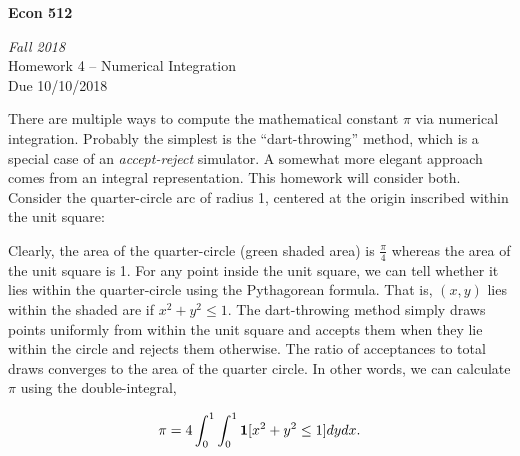 \documentclass{article}
\newcommand{\ind}[1]{{\bf 1  }[ #1 ] }
\begin{document}
\begin{center}
\textbf{Econ 512}

\emph{Fall 2018}\\[1em]

Homework 4 -- Numerical Integration \\
Due 10/10/2018
\\[3em]
\end{center}

\bigskip

There are multiple ways to compute the mathematical constant $\pi$ via numerical integration. 
Probably the simplest is the ``dart-throwing'' method, which is a special case of an {\it accept-reject}
simulator. A somewhat more elegant approach comes from an integral representation. 
This homework will consider both.
Consider the quarter-circle arc of radius 1, centered at the origin inscribed within the unit square:



\begin{center}
\end{center}

Clearly, the area of the quarter-circle (green shaded area) is $\frac{\pi}{4}$ whereas the area of the unit square is 1.
For any point inside the unit square, we can tell whether it lies within the quarter-circle using the Pythagorean formula. 
That is, $(x,y)$ lies within the shaded are if $x^2 + y^2 \leq 1$. The dart-throwing method simply draws points uniformly from within the unit
square and accepts them when they lie within the circle and rejects them otherwise. The ratio of acceptances to total draws converges
to the area of the quarter circle. In other words, we can calculate $\pi$ using the double-integral,

$$ \pi = 4 \int_0^1 \int_0^1  \ind{ x^2 + y^2 \leq 1} dy dx. $$
 
\end{document}
